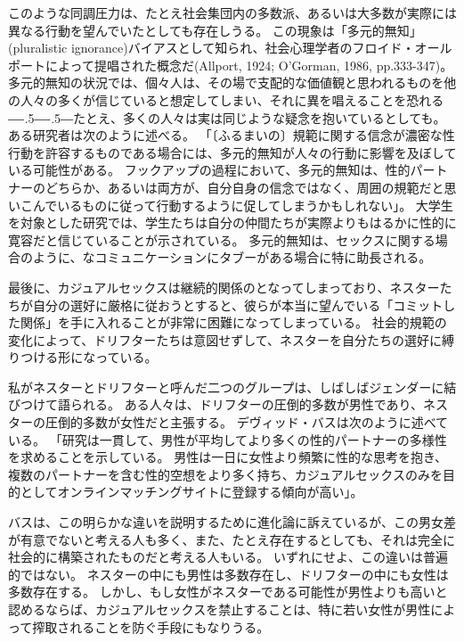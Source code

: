 \documentclass[paper=a4,book,openany]{jlreq}
\def\DDASH{―\kern-.5\zw―\kern-.5\zw―} %
\begin{document}
このような同調圧力は、たとえ社会集団内の多数派、あるいは大多数が実際には異なる行動を望んでいたとしても存在しうる。
この現象は「多元的無知」(pluralistic ignorance)バイアスとして知られ、社会心理学者のフロイド・オールポートによって提唱された概念だ(Allport, 1924; O'Gorman, 1986, pp.333-347)。
\nocite{allport24:_social_psyc,ogorman86:_disc_plur_ignor}多元的無知の状況では、個々人は、その場で支配的な価値観と思われるものを他の人々の多くが信じていると想定してしまい、それに異を唱えることを恐れる{\DDASH}たとえ、多くの人々は実は同じような疑念を抱いているとしても。
ある研究者は次のように述べる。
「〔ふるまいの〕規範に関する信念が濃密な性行動を許容するものである場合には、多元的無知が人々の行動に影響を及ぼしている可能性がある。
フックアップの過程において、多元的無知は、性的パートナーのどちらか、あるいは両方が、自分自身の信念ではなく、周囲の規範だと思いこんでいるものに従って行動するように促してしまうかもしれない」\citep[p.130]{griggs03:_plur_ignor_hook_up}。
大学生を対象とした研究では、学生たちは自分の仲間たちが実際よりもはるかに性的に寛容だと信じていることが示されている\citep{chia06:_how_media_cont,reiber10:_hook_up}。
多元的無知は、セックスに関する場合のように、なコミュニケーションにタブーがある場合に特に助長される。

最後に、カジュアルセックスは継続的関係のとなってしまっており、ネスターたちが自分の選好に厳格に従おうとすると、彼らが本当に望んでいる「コミットした関係」を手に入れることが非常に困難になってしまっている。
社会的規範の変化によって、ドリフターたちは意図せずして、ネスターを自分たちの選好に縛りつける形になっている。

私がネスターとドリフターと呼んだ二つのグループは、しばしばジェンダーに結びつけて語られる。
ある人々は、ドリフターの圧倒的多数が男性であり、ネスターの圧倒的多数が女性だと主張する\citep[cf.][]{regnerus12:_cont_matin_mark}。
デヴィッド・バスは次のように述べている。
「研究は一貫して、男性が平均してより多くの性的パートナーの多様性を求めることを示している。
男性は一日に女性より頻繁に性的な思考を抱き、複数のパートナーを含む性的空想をより多く持ち、カジュアルセックスのみを目的としてオンラインマッチングサイトに登録する傾向が高い」\citep{buss16:_what_do_you}。

バスは、この明らかな違いを説明するために進化論に訴えているが、この男女差が有意でないと考える人も多く、また、たとえ存在するとしても、それは完全に社会的に構築されたものだと考える人もいる。
いずれにせよ、この違いは普遍的ではない。
ネスターの中にも男性は多数存在し、ドリフターの中にも女性は多数存在する。
しかし、もし女性がネスターである可能性が男性よりも高いと認めるならば、カジュアルセックスを禁止することは、特に若い女性が男性によって搾取されることを防ぐ手段にもなりうる。
\end{document}
